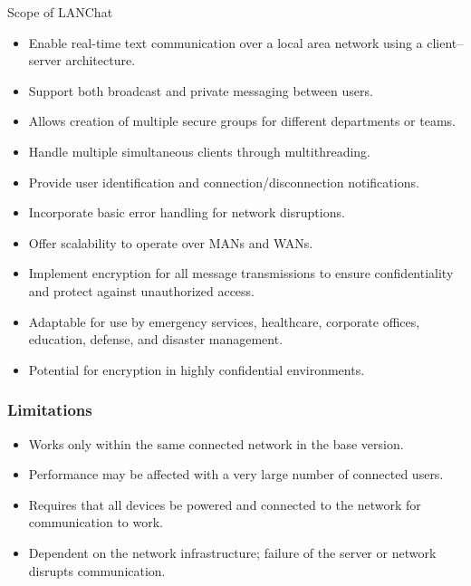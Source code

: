 \documentclass[aspectratio=1610]{beamer}
\begin{document}
\begin{frame}{Scope of LANChat}
\small %

\begin{itemize}
    \setlength\itemsep{0.5em} %

    \item Enable real-time text communication over a local area network using a client--server architecture.
    \item Support both broadcast and private messaging between users.
    \item Allows creation of multiple secure groups for different departments or teams.
    \item Handle multiple simultaneous clients through multithreading.
    \item Provide user identification and connection/disconnection notifications.
    \item Incorporate basic error handling for network disruptions.
    \item Offer scalability to operate over MANs and WANs.
    \item Implement encryption for all message transmissions to ensure confidentiality and protect against unauthorized access.
    \item Adaptable for use by emergency services, healthcare, corporate offices, education, defense, and disaster management.
    \item Potential for encryption in highly confidential environments.
\end{itemize}

\end{frame}
\begin{frame}
\frametitle{Limitations}

\begin{itemize}
    \setlength\itemsep{1em} %

    \item Works only within the same connected network in the base version.
    
    \item Performance may be affected with a very large number of connected users.
    
    \item Requires that all devices be powered and connected to the network for communication to work.
    
    \item Dependent on the network infrastructure; failure of the server or network disrupts communication.
\end{itemize}

\end{frame}
\end{document}
